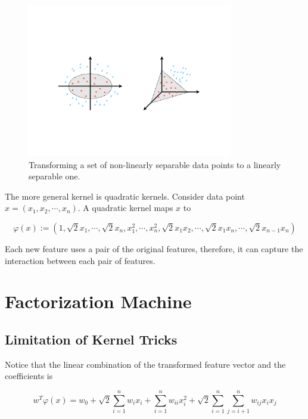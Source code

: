         \begin{figure}[!htp]
            \centering
            \includegraphics[width=0.8\textwidth]{img/kernel-tricks.pdf}
            \caption{Transforming a set of non-linearly separable data points to a linearly separable one.}
            \label{fig:kernel-tricks}
        \end{figure}

        The more general kernel is quadratic kernels.
        Consider data point $x = (x_1, x_2, \cdots, x_n)$.
        A quadratic kernel maps $x$ to 

        \[
        \varphi(x) := (1, \sqrt{2}x_1, \cdots, \sqrt{2}x_n, x_1^2, \cdots, x_n^2,
          \sqrt{2}x_1x_2, \cdots, \sqrt{2}x_1x_n, \cdots, \sqrt{2}x_{n-1}x_n)
        \]

        Each new feature uses a pair of the original features,
        therefore, it can capture the interaction between each pair of features.

\section{Factorization Machine}

    \subsection{Limitation of Kernel Tricks}

        Notice that the linear combination of the transformed feature vector and the coefficients is

        \[
        w^T\varphi(x) = w_0 + \sqrt{2}\sum_{i=1}^n w_ix_i
        + \sum_{i=1}^n w_{ii}x_i^2 + \sqrt{2}\sum_{i=1}^n\sum_{j=i+1}^n w_{ij}x_ix_j
        \]

